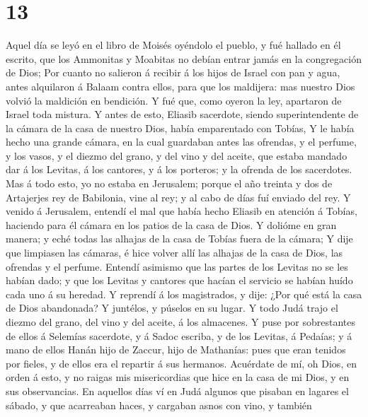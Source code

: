 \hypertarget{section-12}{%
\section{13}\label{section-12}}

 Aquel día se leyó en el libro de Moisés oyéndolo el pueblo,
y fué hallado en él escrito, que los Ammonitas y Moabitas no debían
entrar jamás en la congregación de Dios;  Por cuanto no
salieron á recibir á los hijos de Israel con pan y agua, antes
alquilaron á Balaam contra ellos, para que los maldijera: mas nuestro
Dios volvió la maldición en bendición.  Y fué que, como
oyeron la ley, apartaron de Israel toda mistura.  Y antes de
esto, Eliasib sacerdote, siendo superintendente de la cámara de la casa
de nuestro Dios, había emparentado con Tobías,  Y le había
hecho una grande cámara, en la cual guardaban antes las ofrendas, y el
perfume, y los vasos, y el diezmo del grano, y del vino y del aceite,
que estaba mandado dar á los Levitas, á los cantores, y á los porteros;
y la ofrenda de los sacerdotes.  Mas á todo esto, yo no
estaba en Jerusalem; porque el año treinta y dos de Artajerjes rey de
Babilonia, vine al rey; y al cabo de días fuí enviado del rey.
 Y venido á Jerusalem, entendí el mal que había hecho
Eliasib en atención á Tobías, haciendo para él cámara en los patios de
la casa de Dios.  Y dolióme en gran manera; y eché todas las
alhajas de la casa de Tobías fuera de la cámara;  Y dije que
limpiasen las cámaras, é hice volver allí las alhajas de la casa de
Dios, las ofrendas y el perfume.  Entendí asimismo que las
partes de los Levitas no se les habían dado; y que los Levitas y
cantores que hacían el servicio se habían huído cada uno á su heredad.
 Y reprendí á los magistrados, y dije: ¿Por qué está la
casa de Dios abandonada? Y juntélos, y púselos en su lugar.
 Y todo Judá trajo el diezmo del grano, del vino y del
aceite, á los almacenes.  Y puse por sobrestantes de ellos
á Selemías sacerdote, y á Sadoc escriba, y de los Levitas, á Pedaías; y
á mano de ellos Hanán hijo de Zaccur, hijo de Mathanías: pues que eran
tenidos por fieles, y de ellos era el repartir á sus hermanos.
 Acuérdate de mí, oh Dios, en orden á esto, y no raigas mis
misericordias que hice en la casa de mi Dios, y en sus observancias.
 En aquellos días ví en Judá algunos que pisaban en lagares
el sábado, y que acarreaban haces, y cargaban asnos con vino, y también
